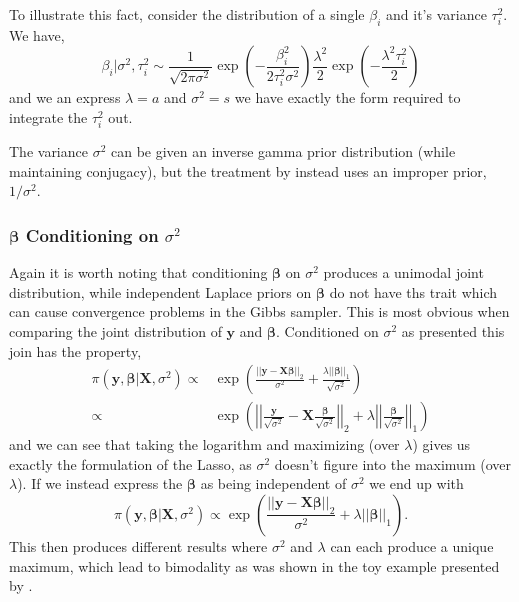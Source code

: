 \documentclass{uwstat572}
\begin{document}
To illustrate this fact, consider the distribution of a single $\beta_i$ and it's variance $\tau_i^2$. We have, \[
\beta_i|\sigma^2,\tau_i^2 \sim \frac{1}{\sqrt{2\pi\sigma^2}}\exp{\left( -\frac{\beta_i^2}{2\tau_i^2\sigma^2}\right)}\frac{\lambda^2}{2}\exp{\left( -\frac{\lambda^2\tau_i^2}{2}\right)} 
\] and we an express $\lambda=a$ and $\sigma^2=s$ we have exactly the form required to integrate the $\tau^2_i$ out.

The variance $\sigma^2$ can be given an inverse gamma prior distribution (while maintaining conjugacy), but the treatment by \cite{park2008bayesian} instead uses an improper prior, $1/\sigma^2$. 



\subsubsection{$\boldsymbol\beta$ Conditioning on $\sigma^2$}\label{unimodal}
Again it is worth noting that conditioning $\boldsymbol\beta$ on $\sigma^2$ produces a unimodal joint distribution, while independent Laplace priors on $\boldsymbol\beta$ do not have ths trait which can cause convergence problems in the Gibbs sampler. This is most obvious when comparing the joint distribution of $\mathbf{y}$ and $\boldsymbol\beta$. Conditioned on $\sigma^2$ as presented this join has the property, 
\begin{align*}
\pi(\mathbf{y},\boldsymbol\beta|\mathbf{X},\sigma^2) \propto& \exp{\left(\frac{||\mathbf{y}-\mathbf{X}\boldsymbol\beta||_2}{\sigma^2}+\frac{\lambda ||\boldsymbol\beta||_1}{\sqrt{\sigma^2}}\right)}\\
\propto& \exp{\left(\left|\left|\frac{\mathbf{y}}{\sqrt{\sigma^2}}-\mathbf{X}\frac{\boldsymbol\beta}{\sqrt{\sigma^2}}\right|\right|_2+\lambda \left|\left|\frac{\boldsymbol\beta}{\sqrt{\sigma^2}}\right|\right|_1\right)}
\end{align*}
and we can see that taking the logarithm and maximizing (over $\lambda$) gives us exactly the formulation of the Lasso, as $\sigma^2$ doesn't figure into the maximum (over $\lambda$). If we instead express the $\boldsymbol\beta$ as being independent of $\sigma^2$ we end up with \[
\pi(\mathbf{y},\boldsymbol\beta|\mathbf{X},\sigma^2) \propto \exp{\left(\frac{||\mathbf{y}-\mathbf{X}\boldsymbol\beta||_2}{\sigma^2}+\lambda ||\boldsymbol\beta||_1\right)}.
\] This then produces different results where $\sigma^2$ and $\lambda$ can each produce a unique maximum, which lead to bimodality as was shown in the toy example presented by \cite{park2008bayesian}.
\end{document}
